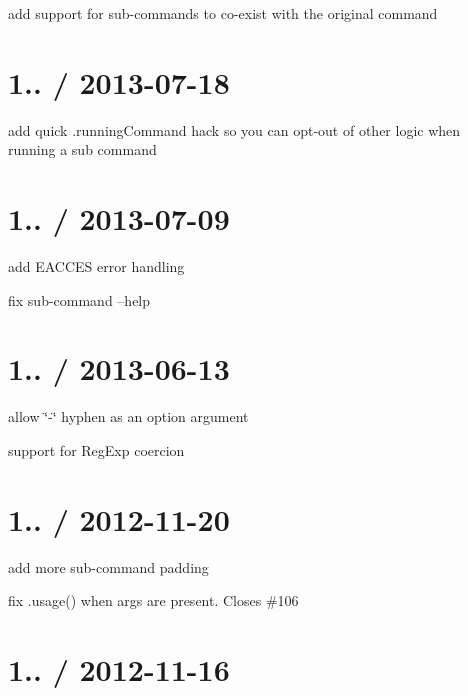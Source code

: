 \begin{DoxyItemize}
\item add support for sub-\/commands to co-\/exist with the original command
\end{DoxyItemize}

\section*{1.. / 2013-\/07-\/18 }


\begin{DoxyItemize}
\item add quick .running\+Command hack so you can opt-\/out of other logic when running a sub command
\end{DoxyItemize}

\section*{1.. / 2013-\/07-\/09 }


\begin{DoxyItemize}
\item add E\+A\+C\+C\+ES error handling
\item fix sub-\/command --help
\end{DoxyItemize}

\section*{1.. / 2013-\/06-\/13 }


\begin{DoxyItemize}
\item allow \char`\"{}-\/\char`\"{} hyphen as an option argument
\item support for Reg\+Exp coercion
\end{DoxyItemize}

\section*{1.. / 2012-\/11-\/20 }


\begin{DoxyItemize}
\item add more sub-\/command padding
\item fix .usage() when args are present. Closes \#106
\end{DoxyItemize}

\section*{1.. / 2012-\/11-\/16 }


